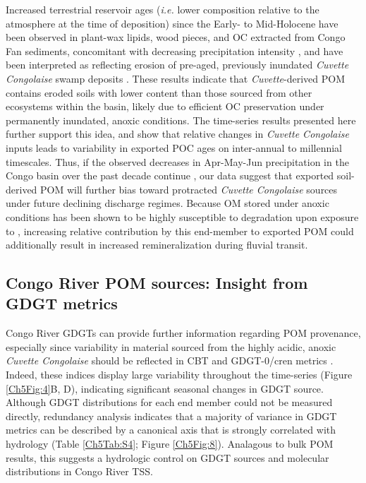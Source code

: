 Increased terrestrial reservoir ages (\textit{i.e.} lower  composition relative to the atmosphere at the time of deposition) since the Early- to Mid-Holocene have been observed in plant-wax lipids, wood pieces, and OC extracted from Congo Fan sediments, concomitant with decreasing precipitation intensity \citep{Schefuss:2005jo}, and have been interpreted as reflecting erosion of pre-aged, previously inundated \textit{Cuvette Congolaise} swamp deposits \citep{Schefuss:2016cp}. These results indicate that \textit{Cuvette}-derived POM contains eroded soils with lower  content than those sourced from other ecosystems within the basin, likely due to efficient OC preservation under permanently inundated, anoxic conditions. The time-series  results presented here further support this idea, and show that relative changes in \textit{Cuvette Congolaise} inputs leads to variability in exported POC ages on inter-annual to millennial timescales. Thus, if the observed decreases in Apr-May-Jun precipitation in the Congo basin over the past decade continue \citep{Zhou:2014gl}, our data suggest that exported soil-derived POM will further bias toward protracted \textit{Cuvette Congolaise} sources under future declining discharge regimes. Because OM stored under anoxic conditions has been shown to be highly susceptible to degradation upon exposure to  \citep{Fenner:2011cu}, increasing relative contribution by this end-member to exported POM could additionally result in increased remineralization during fluvial transit.

\subsection{Congo River POM sources: Insight from GDGT metrics}

Congo River GDGTs can provide further information regarding POM provenance, especially since variability in material sourced from the highly acidic, anoxic \textit{Cuvette Congolaise} \citep{Mann:2014jx} should be reflected in CBT and GDGT-0/cren metrics \citep{Blaga:2009ge,Peterse:2012bs}. Indeed, these indices display large variability throughout the time-series (Figure \ref{Ch5Fig:4}B, D), indicating significant seasonal changes in GDGT source. Although GDGT distributions for each end member could not be measured directly, redundancy analysis \citep[RDA;][]{Legendre:1998tt} indicates that a majority of variance in GDGT metrics can be described by a canonical axis that is strongly correlated with hydrology (Table \ref{Ch5Tab:S4}; Figure \ref{Ch5Fig:8}). Analagous to bulk POM results, this suggests a hydrologic control on GDGT sources and molecular distributions in Congo River TSS. 

